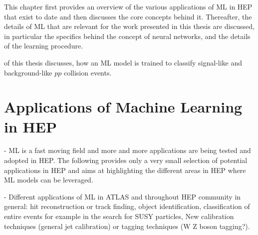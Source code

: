This chapter first provides an overview of the various applications of ML in HEP that exist to date and then discusses the core concepts behind it. Thereafter, the details of ML that are relevant for the work presented in this thesis are discussed, in particular the specifics behind the concept of neural networks, and the details of the learning procedure.

 of this thesis discusses, how an ML model is trained to classify signal-like and background-like $pp$ collision events. 



\section{Applications of Machine Learning in HEP}
- ML is a fast moving field and more and more applications are being tested and adopted in HEP. The following provides only a very small selection of potential applications in HEP and aims at highlighting the different areas in HEP where ML models can be leveraged. 


- Different applications of ML in ATLAS and throughout HEP community in general: hit reconstruction  or track finding, object identification, classification of entire events for example in the search for SUSY particles, New calibration techniques (general jet calibration) or tagging techniques (W Z boson tagging?). 


